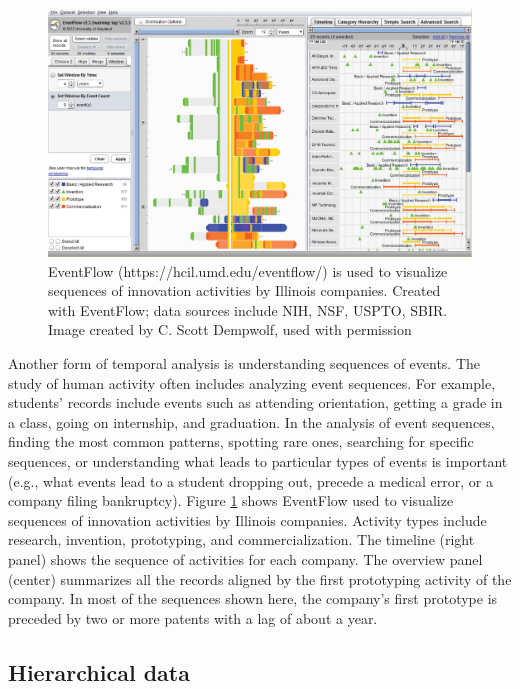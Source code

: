 \documentclass[]{krantz}
\begin{document}
\begin{figure}

{\centering \includegraphics[width=0.9\linewidth]{ChapterViz/figures/fig9-7} 

}

\caption{EventFlow (https://hcil.umd.edu/eventflow/) is used to visualize sequences of innovation activities by Illinois companies. Created with EventFlow; data sources include NIH, NSF, USPTO, SBIR. Image created by C. Scott Dempwolf, used with permission}\label{fig:fig9-7}
\end{figure}

Another form of temporal analysis is understanding sequences of events.
The study of human activity often includes analyzing event sequences.
For example, students' records include events such as attending
orientation, getting a grade in a class, going on internship, and
graduation. In the analysis of event sequences, finding the most common
patterns, spotting rare ones, searching for specific sequences, or
understanding what leads to particular types of events is important
(e.g., what events lead to a student dropping out, precede a medical
error, or a company filing bankruptcy). Figure \ref{fig:fig9-7} shows
EventFlow used to visualize sequences of innovation activities by
Illinois companies. Activity types include research, invention,
prototyping, and commercialization. The timeline (right panel) shows the
sequence of activities for each company. The overview panel (center)
summarizes all the records aligned by the first prototyping activity of
the company. In most of the sequences shown here, the company's first
prototype is preceded by two or more patents with a lag of about a year.

\hypertarget{sec:viz-2.5}{\subsection{Hierarchical
data}\label{sec:viz-2.5}}
\end{document}
